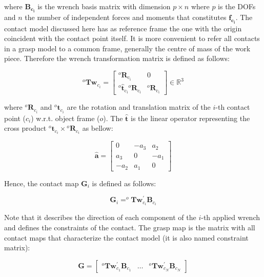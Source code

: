 \noindent
where $\mathbf{{B}_{c_i}}$ is the wrench basis matrix with dimension $p \times n$ where $p$ is the \acp{DOF} and $n$ the number of independent forces and moments that constitutes $\mathbf{{f}_{c_i}}$. The contact model discussed here has as reference frame the one with the origin coincident with the contact point itself. It is more convenient to refer all contacts in a grasp model to a common frame, generally the centre of mass of the work piece. Therefore the wrench transformation matrix is defined as follows:

\begin{equation}
^{o} \mathbf{Tw}_{c_i}=\left[\begin{array}{cc}
{^{o} \mathbf{R}_{\mathrm{c_i}}} & {0} \\
{^o \hat{\mathbf{t}}_{\mathrm{c_i}} {}^{o} \mathbf{R}_{\mathrm{c_i}}} & {^{o} \mathbf{R}_{\mathrm{c_i}}}
\end{array}\right]
\in \mathbb{R}^3
\end{equation}

\noindent
where $ ^o\mathbf{R}_{c_i}$ and $^o\mathbf{t}_{c_i}$ are the rotation and translation matrix of the $i$-th contact point ($c_i$) w.r.t. object frame ($o$). The $\mathbf{\hat{t}}$ is the linear operator representing the cross product $^o\mathbf{t}_{c_i} \times {{{}^o}\mathbf{R}}_{c_i}$ as bellow:

\begin{equation}
\widehat{\boldsymbol{a}}=\left[\begin{array}{ccc}
0 & -a_{3} & a_{2} \\
a_{3} & 0 & -a_{1} \\
-a_{2} & a_{1} & 0
\end{array}\right]
\end{equation}


Hence, the contact map $\mathbf{G}_{i}$ is defined as follows:

\begin{equation}
\mathbf{G}_{i}=^{o} \mathbf{T} \mathbf{w}_{c_i}^{\prime} \mathbf{B}_{c_i}
\end{equation}

Note that it describes the direction of each component of the $i$-th applied wrench and defines the constraints of the contact. The grasp map is the matrix with all contact maps that characterize the contact model (it is also named constraint matrix):

\begin{equation}
\mathbf{G}=\left[\begin{array}{llll}
{{}^o \mathbf{T} \mathbf{w}_{c_1}^{\prime} \mathbf{B}_{c_1}} & {\dots} & {{}^{o} \mathbf{T} \mathbf{w}_{c_N}^{\prime} \mathbf{B}_{c_N}}
\end{array}\right]
\end{equation}

